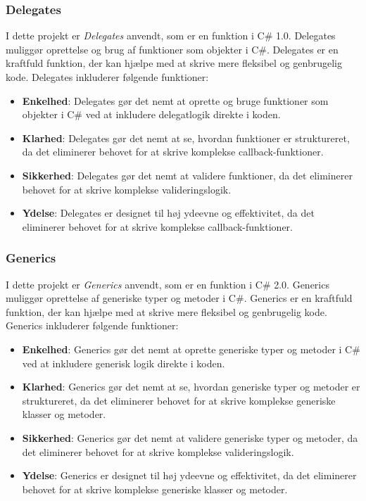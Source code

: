 \subsubsection{Delegates}
I dette projekt er \emph{Delegates} anvendt, som er en funktion i C\# 1.0. Delegates muliggør oprettelse og brug af funktioner som objekter i C\#. Delegates er en kraftfuld funktion, der kan hjælpe med at skrive mere fleksibel og genbrugelig kode. Delegates inkluderer følgende funktioner:
\begin{itemize}
\item \textbf{Enkelhed}: Delegates gør det nemt at oprette og bruge funktioner som objekter i C\# ved at inkludere delegatlogik direkte i koden.
\item \textbf{Klarhed}: Delegates gør det nemt at se, hvordan funktioner er struktureret, da det eliminerer behovet for at skrive komplekse callback-funktioner.
\item \textbf{Sikkerhed}: Delegates gør det nemt at validere funktioner, da det eliminerer behovet for at skrive komplekse valideringslogik.
\item \textbf{Ydelse}: Delegates er designet til høj ydeevne og effektivitet, da det eliminerer behovet for at skrive komplekse callback-funktioner.
\end{itemize}

\subsubsection{Generics}
I dette projekt er \emph{Generics} anvendt, som er en funktion i C\# 2.0. Generics muliggør oprettelse af generiske typer og metoder i C\#. Generics er en kraftfuld funktion, der kan hjælpe med at skrive mere fleksibel og genbrugelig kode. Generics inkluderer følgende funktioner:
\begin{itemize}
\item \textbf{Enkelhed}: Generics gør det nemt at oprette generiske typer og metoder i C\# ved at inkludere generisk logik direkte i koden.
\item \textbf{Klarhed}: Generics gør det nemt at se, hvordan generiske typer og metoder er struktureret, da det eliminerer behovet for at skrive komplekse generiske klasser og metoder.
\item \textbf{Sikkerhed}: Generics gør det nemt at validere generiske typer og metoder, da det eliminerer behovet for at skrive komplekse valideringslogik.
\item \textbf{Ydelse}: Generics er designet til høj ydeevne og effektivitet, da det eliminerer behovet for at skrive komplekse generiske klasser og metoder.
\end{itemize}

